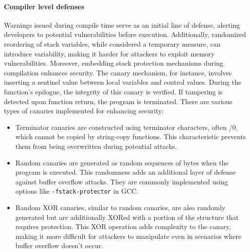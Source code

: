 \paragraph*{Compiler level defenses}
Warnings issued during compile time serve as an initial line of defense, alerting developers to potential vulnerabilities before execution.
Additionally, randomized reordering of stack variables, while considered a temporary measure, can introduce variability, making it harder for attackers to exploit memory vulnerabilities.
Moreover, embedding stack protection mechanisms during compilation enhances security.
The canary mechanism, for instance, involves inserting a sentinel value between local variables and control values. 
During the function's epilogue, the integrity of this canary is verified. If tampering is detected upon function return, the program is terminated.
There are various types of canaries implemented for enhancing security:
\begin{itemize}
    \item Terminator canaries are constructed using terminator characters, often /0, which cannot be copied by string-copy functions. 
        This characteristic prevents them from being overwritten during potential attacks.
    \item Random canaries are generated as random sequences of bytes when the program is executed. 
        This randomness adds an additional layer of defense against buffer overflow attacks. 
        They are commonly implemented using options like \texttt{-fstack-protector} in GCC.
    \item Random XOR canaries, similar to random canaries, are also randomly generated but are additionally XORed with a portion of the structure that requires protection. 
        This XOR operation adds complexity to the canary, making it more difficult for attackers to manipulate even in scenarios where buffer overflow doesn't occur.
\end{itemize}

